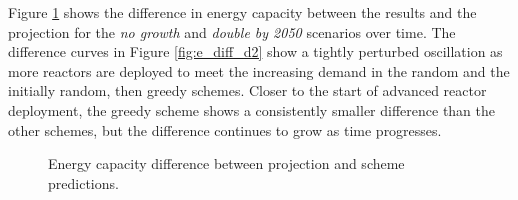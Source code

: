 Figure \ref{fig:e_diff} shows the difference in energy capacity between the results and the projection for the \textit{no growth} and \textit{double by 2050} scenarios over time. The difference curves in Figure \ref{fig:e_diff_d2} show a tightly perturbed oscillation as more reactors are deployed to meet the increasing demand in the random and the initially random, then greedy schemes. Closer to the start of advanced reactor deployment, the greedy scheme shows a consistently smaller difference than the other schemes, but the difference continues to grow as time progresses.

\begin{figure}[H]
    \hfill
    \caption{Energy capacity difference between projection and scheme predictions.}
    \label{fig:e_diff}
\end{figure}

